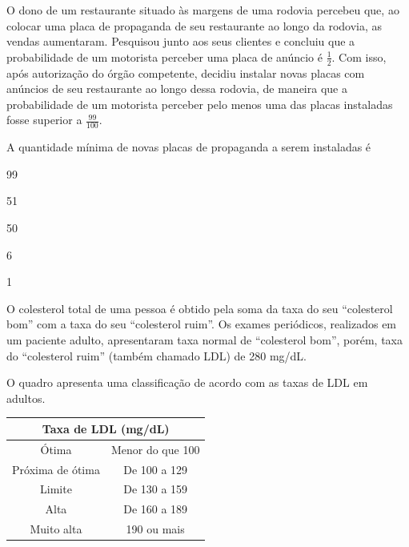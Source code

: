 \twocolumn

\questao
O dono de um restaurante situado às margens de
uma rodovia percebeu que, ao colocar uma placa de
propaganda de seu restaurante ao longo da rodovia, as
vendas aumentaram. Pesquisou junto aos seus clientes
e concluiu que a probabilidade de um motorista perceber
uma placa de anúncio é $\displaystyle \frac{1}{2}$.
Com isso, após autorização
do órgão competente, decidiu instalar novas placas com
anúncios de seu restaurante ao longo dessa rodovia, de
maneira que a probabilidade de um motorista perceber
pelo menos uma das placas instaladas fosse superior
a $\displaystyle \frac{99}{100}$.

A quantidade mínima de novas placas de propaganda a
serem instaladas é

\begin{alternativas}
\item 99
\item 51
\item 50
\item 6
\item 1
\end{alternativas}

\questao
O colesterol total de uma pessoa é obtido pela
soma da taxa do seu “colesterol bom” com a taxa do
seu “colesterol ruim”. Os exames periódicos, realizados
em um paciente adulto, apresentaram taxa normal
de “colesterol bom”, porém, taxa do “colesterol ruim”
(também chamado LDL) de 280 mg/dL.

O quadro apresenta uma classificação de acordo com
as taxas de LDL em adultos.

\begin{center}
\begin{tabular}{|c|c|}
\hline
\multicolumn{2}{|c|}{\textbf{Taxa de LDL (mg/dL)}} \\
\hline
Ótima & Menor do que 100 \\
\hline
Próxima de ótima & De 100 a 129 \\
\hline
Limite & De 130 a 159 \\
\hline
Alta & De 160 a 189 \\
\hline
Muito alta & 190 ou mais \\
\hline
\end{tabular}
\end{center}


